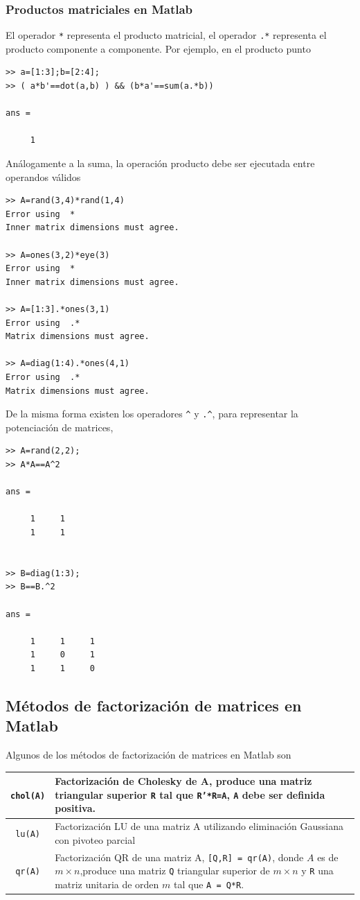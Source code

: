 \documentclass[12pt,letterpaper]{article}
\begin{document}
\subsubsection{Productos matriciales en Matlab}
El operador \texttt{*} representa el producto matricial, el operador \texttt{.*} representa el producto componente 
a componente. Por ejemplo, en el producto punto
\begin{verbatim}
>> a=[1:3];b=[2:4];
>> ( a*b'==dot(a,b) ) && (b*a'==sum(a.*b))

ans =

     1
\end{verbatim}
An\'alogamente a la suma, la operaci\'on producto debe ser ejecutada entre operandos v\'alidos
\begin{multicols}{2}
\begin{verbatim}
>> A=rand(3,4)*rand(1,4)
Error using  * 
Inner matrix dimensions must agree.

>> A=ones(3,2)*eye(3)
Error using  * 
Inner matrix dimensions must agree.

>> A=[1:3].*ones(3,1)
Error using  .* 
Matrix dimensions must agree.
 
>> A=diag(1:4).*ones(4,1)
Error using  .* 
Matrix dimensions must agree.
\end{verbatim}
\end{multicols}
De la misma forma existen los operadores \texttt{\^} y \texttt{.\^}, para representar la potenciaci\'on de matrices,
\begin{multicols}{2}
\begin{verbatim}
>> A=rand(2,2);
>> A*A==A^2

ans =

     1     1
     1     1


>> B=diag(1:3);
>> B==B.^2

ans =

     1     1     1
     1     0     1
     1     1     0
\end{verbatim}
\end{multicols}

\subsection{M\'etodos de factorizaci\'on de matrices en Matlab}

Algunos de los m\'etodos de factorizaci\'on de matrices en Matlab son
\begin{longtable}{||c|p{}||}
\hline
\texttt{chol(A)}	&	Factorizaci\'on de Cholesky de A, produce una matriz triangular superior \texttt{R} tal que 
\texttt{R'*R=A}, \texttt{A} debe ser definida positiva.		\\ 	\hline
\texttt{lu(A)}		& 	Factorizaci\'on LU de una matriz A utilizando eliminación Gaussiana con pivoteo parcial	\\	\hline
\texttt{qr(A)}		& 	Factorizaci\'on QR de una matriz A, \texttt{[Q,R] = qr(A)}, donde $A$ es de $m\times n$,produce una matriz \texttt{Q} triangular superior de $m\times n$ y \texttt{R} una matriz unitaria de orden $m$ tal que \texttt{A = Q*R}.	\\	\hline
\end{longtable}
\end{document}

